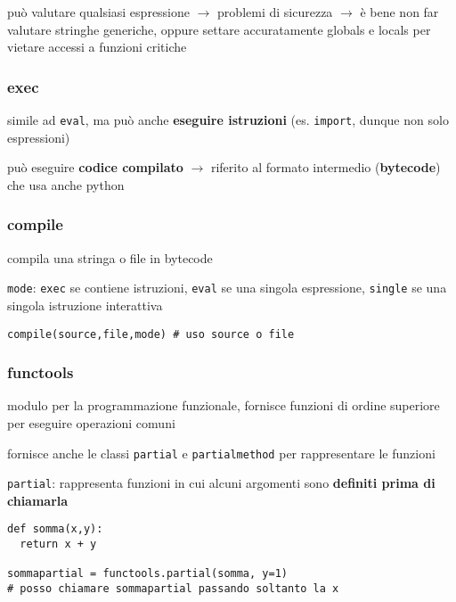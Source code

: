 pu\`o valutare qualsiasi espressione $\rightarrow$ problemi di sicurezza $\rightarrow$ \`e bene non far valutare stringhe generiche, oppure settare accuratamente globals e locals per vietare accessi a funzioni critiche

\subsubsection{exec}

simile ad \texttt{eval}, ma pu\`o anche \textbf{eseguire istruzioni} (es. \texttt{import}, dunque non solo espressioni)

pu\`o eseguire \textbf{codice compilato} $\rightarrow$ riferito al formato intermedio (\textbf{bytecode}) che usa anche python

\subsubsection{compile}

compila una stringa o file in bytecode

\texttt{mode}: \texttt{exec} se contiene istruzioni, \texttt{eval} se una singola espressione, \texttt{single} se una singola istruzione interattiva

\begin{verbatim}
compile(source,file,mode) # uso source o file
\end{verbatim}

\subsubsection{functools}

modulo per la programmazione funzionale, fornisce funzioni di ordine superiore per eseguire operazioni comuni

fornisce anche le classi \texttt{partial} e \texttt{partialmethod} per rappresentare le funzioni

\texttt{partial}: rappresenta funzioni in cui alcuni argomenti sono \textbf{definiti prima di chiamarla}

\begin{verbatim}
def somma(x,y):
  return x + y

sommapartial = functools.partial(somma, y=1)
# posso chiamare sommapartial passando soltanto la x
\end{verbatim}

